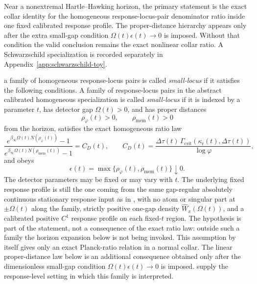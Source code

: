 Near a nonextremal Hartle--Hawking horizon, the primary statement is the exact
collar identity for the homogeneous response-locus-pair denominator ratio
inside one fixed calibrated response profile. The proper-distance hierarchy
appears only after the extra small-gap condition
$\Omega(t)\epsilon(t)\to0$ is imposed. Without that condition the valid
conclusion remains the exact nonlinear collar ratio. A Schwarzschild
specialization is recorded separately in Appendix~\ref{app:schwarzschild-toy}.

\begin{assumption}\label{ass:small-shell-main}
\ModelAClause a family of homogeneous response-locus
pairs is called \emph{small-locus} if it satisfies the following conditions.
A family of response-locus pairs in the abstract calibrated homogeneous specialization is called \emph{small-locus} if it is indexed by a parameter $t$, has detector gap $\Omega(t)>0$, and has proper distances
\[
\rho_\varphi(t)>0,\qquad \rho_{\mathrm{mem}}(t)>0
\]
from the horizon, satisfies the exact homogeneous ratio law
\[
\frac{e^{\beta_\infty\Omega(t) N(\rho_\varphi(t))}-1}
     {e^{\beta_\infty\Omega(t) N(\rho_{\mathrm{mem}}(t))}-1}
=C_D(t),
\qquad
C_D(t)=
\frac{\Delta\tau(t)\,\Gamma_{\mathrm{crit}}(\kappa_{\mathrm r}(t),\Delta\tau(t))}
{\log\varphi},
\]
and obeys
\[
\epsilon(t)=\max\{\rho_\varphi(t),\rho_{\mathrm{mem}}(t)\}\downarrow0 .
\]
The detector parameters may be fixed or may vary with $t$. The underlying fixed
response profile is still the one coming from the same gap-regular absolutely
continuous stationary response input as in , with no
atom or singular part at $\pm\Omega(t)$ along the family, strictly positive
one-gap density $\widehat W_x(\Omega(t))$, and a calibrated positive $C^1$
response profile on each fixed-$t$ region. The hypothesis is part of the
statement, not a consequence of the exact ratio law: outside such a family the
horizon expansion below is not being invoked. This assumption by itself gives
only an exact Planck-ratio relation in a normal collar. The linear
proper-distance law below is an additional consequence obtained only after the
dimensionless small-gap condition
$\Omega(t)\epsilon(t)\to0$ is imposed.
supply the response-level setting in which this family is interpreted.
\end{assumption}

